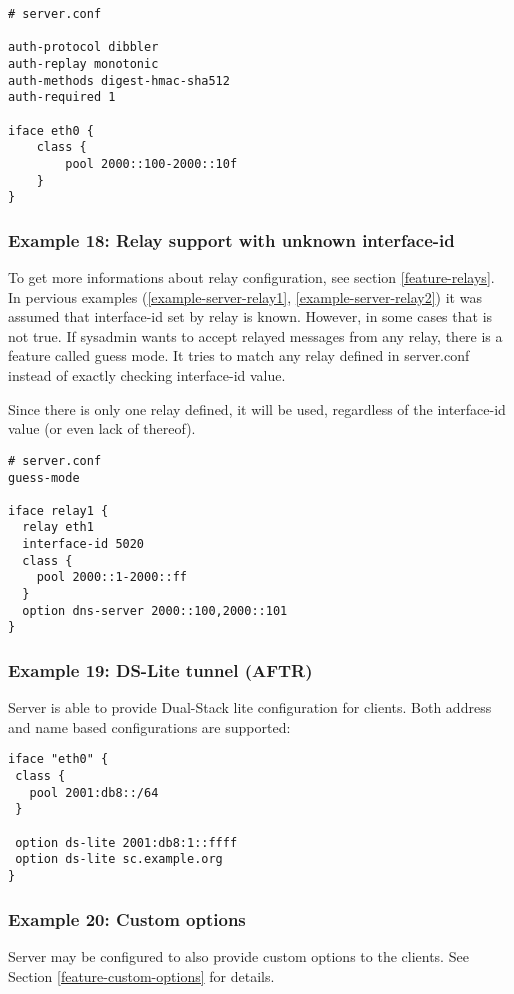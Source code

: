 \begin{lstlisting}
# server.conf

auth-protocol dibbler
auth-replay monotonic
auth-methods digest-hmac-sha512
auth-required 1

iface eth0 {
    class {
        pool 2000::100-2000::10f
    }
}
\end{lstlisting}

\subsubsection{Example 18: Relay support with unknown interface-id}
\label{example-server-relay3}
To get more informations about relay configuration, see section \ref{feature-relays}.
In pervious examples (\ref{example-server-relay1},
\ref{example-server-relay2}) it was assumed that interface-id set by
relay is known. However, in some cases that is not true. If sysadmin
wants to accept relayed messages from any relay, there is a feature
called guess mode. It tries to match any relay defined in server.conf
instead of exactly checking interface-id value.

Since there is only one relay defined, it will be used, regardless of
the interface-id value (or even lack of thereof).

\begin{lstlisting}
# server.conf
guess-mode

iface relay1 {
  relay eth1
  interface-id 5020
  class {
    pool 2000::1-2000::ff
  }
  option dns-server 2000::100,2000::101
}
\end{lstlisting}


\subsubsection{Example 19: DS-Lite tunnel (AFTR)}
Server is able to provide Dual-Stack lite configuration for clients.
Both address and name based configurations are supported:

\begin{lstlisting}
iface "eth0" {
 class {
   pool 2001:db8::/64
 }

 option ds-lite 2001:db8:1::ffff
 option ds-lite sc.example.org
}
\end{lstlisting}

\subsubsection{Example 20: Custom options}
\label{example-server-custom}
Server may be configured to also provide custom options to the
clients. See Section \ref{feature-custom-options} for details.

